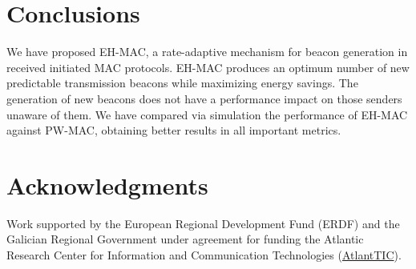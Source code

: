 \documentclass[journal,english,twocolumn,10pt,letterpaper]{IEEEtran}
\begin{document}
\section{Conclusions}
\label{sec:conclusions}

We have proposed EH-MAC, a rate-adaptive mechanism for beacon generation in
received initiated MAC protocols. EH-MAC produces an optimum number of new
predictable transmission beacons while maximizing energy savings. The
generation of new beacons does not have a performance impact on those senders
unaware of them. We have compared via simulation the performance of EH-MAC
against PW-MAC, obtaining better results in all important
metrics.

\section*{Acknowledgments}
\label{sec:acknowledgment}

Work supported by the European Regional Development Fund (ERDF) and the
Galician Regional Government under agreement for funding the Atlantic Research
Center for Information and Communication Technologies
(\href{http://atlanttic.uvigo.es/en/}{AtlantTIC}).

\balance 



\end{document}
